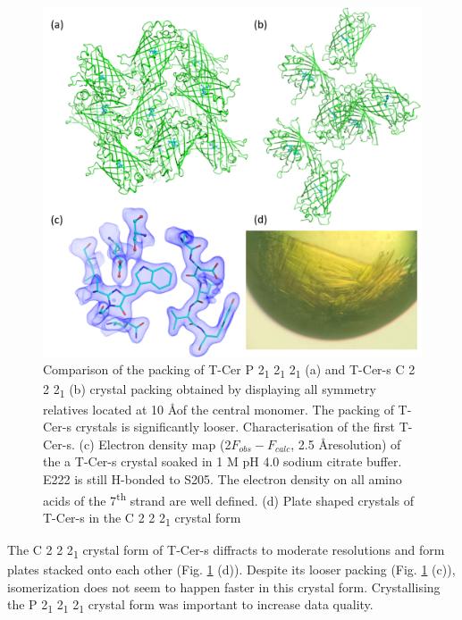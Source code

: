 \begin{figure}[H] %
    \centering
        \noindent \includegraphics[width=\textwidth]{images/T-Cer/T-Cer-s_firstcrystals.pdf}
    \hfill
    \caption{Comparison of the packing of T-Cer P 2\textsubscript{1} 2\textsubscript{1} 2\textsubscript{1} (a) and T-Cer-s C 2 2 2\textsubscript{1} (b) crystal packing obtained by displaying all symmetry relatives located at 10 \AA of the central monomer.  The packing of T-Cer-s crystals is significantly looser. 
    Characterisation of the first T-Cer-s. (c) Electron density map (2\(F_{obs} - F_{calc}\), 2.5 \AA resolution) of the a T-Cer-s crystal soaked in 1 M pH 4.0 sodium citrate buffer. E222 is still H-bonded to S205. The electron density on all amino acids of the 7\textsuperscript{th} strand are well defined. (d) Plate shaped crystals of T-Cer-s in the C 2 2 2\textsubscript{1} crystal form}\label{fig:T-Cer-fristcryst}
\end{figure}

The C 2 2 2\textsubscript{1} crystal form of T-Cer-s diffracts to moderate resolutions and form plates stacked onto each other (Fig. \ref{fig:T-Cer-fristcryst} (d)). Despite its looser packing (Fig. \ref{fig:T-Cer-fristcryst} (c)), isomerization does not seem to happen faster in this crystal form.  Crystallising the P 2\textsubscript{1} 2\textsubscript{1} 2\textsubscript{1} crystal form was important to increase data quality. 

